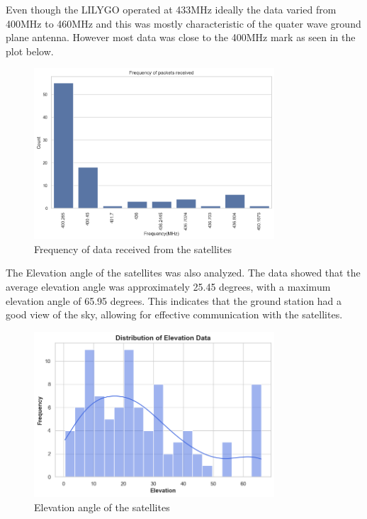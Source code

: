 \documentclass[12pt,a4paper]{article}
\begin{document}
Even though the LILYGO operated at 433MHz ideally the data varied from 400MHz to 460MHz and this was mostly characteristic of the quater wave ground plane antenna. However most data was close to the 400MHz mark as seen in the plot below.
\begin{figure}[H]
    \centering
    \includegraphics[width=0.8\textwidth]{../images/frequencies.png}
    \caption{Frequency of data received from the satellites}
    \label{fig:frequency_data}
\end{figure}

The Elevation angle of the satellites was also analyzed. The data showed that the average elevation angle was approximately 25.45 degrees, with a maximum elevation angle of 65.95 degrees. This indicates that the ground station had a good view of the sky, allowing for effective communication with the satellites.
\begin{figure}[H]
    \centering
    \includegraphics[width=0.8\textwidth]{../images/elevation.png}
    \caption{Elevation angle of the satellites}
    \label{fig:elevation_data}
\end{figure}
\end{document}
